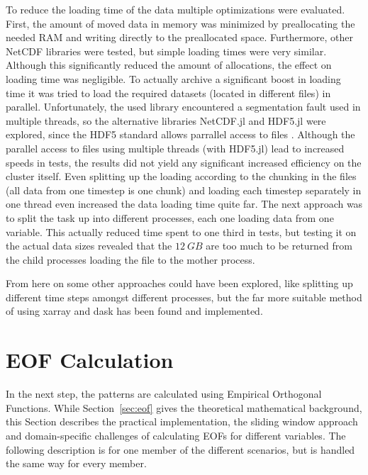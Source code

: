 To reduce the loading time of the data multiple optimizations were evaluated. 
First, the amount of moved data in memory was minimized by preallocating the needed RAM and writing directly to the preallocated space. 
Furthermore, other NetCDF libraries were tested, but simple loading times were very similar. 
Although this significantly reduced the amount of allocations, the effect on loading time was negligible. 
To actually archive a significant boost in loading time it was tried to load the required datasets (located in different files) in parallel. 
Unfortunately, the used library \cite{barth_ncdatasetsjl_2024} encountered a segmentation fault used in multiple threads, so the alternative libraries NetCDF.jl and HDF5.jl were explored, since the HDF5 standard allows parrallel access to files \cite{folk_overview_2011}. 
Although the parallel access to files using multiple threads (with HDF5.jl) lead to increased speeds in tests, the results did not yield any significant increased efficiency on the cluster itself.
Even splitting up the loading according to the chunking in the files (all data from one timestep is one chunk) and loading each timestep separately in one thread even increased the data loading time quite far.  
The next approach was to split the task up into different processes, each one loading data from one variable. This actually reduced time spent to one third in tests, but testing it on the actual data sizes revealed that the $12~GB$ are too much to be returned from the child processes loading the file to the mother process. 

From here on some other approaches could have been explored, like splitting up different time steps amongst different processes, but the far more suitable method of using xarray and dask has been found and implemented.


\section{EOF Calculation}
\label{sec:eof_calc}

In the next step, the patterns are calculated using Empirical Orthogonal Functions. While Section~\ref{sec:eof} gives the theoretical mathematical background, this Section describes the practical implementation, the sliding window approach and domain-specific challenges of calculating EOFs for different variables. The following description is for one member of the different scenarios, but is handled the same way for every member.  

